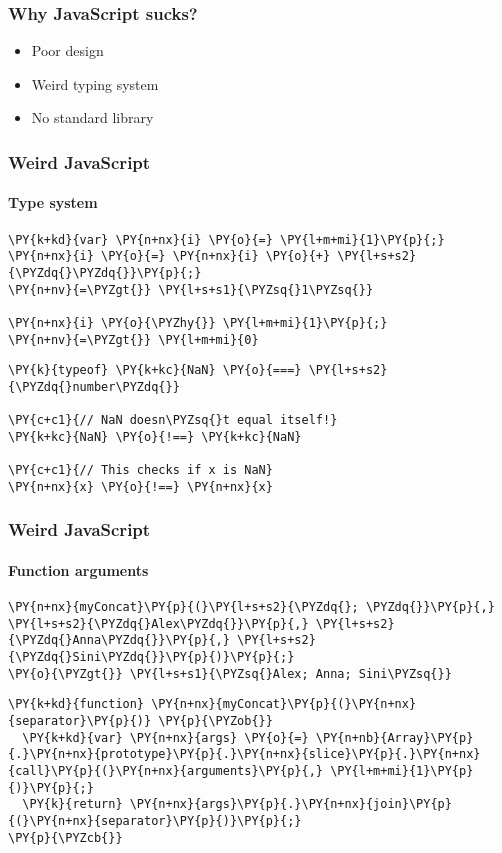 \begin{frame}
  \frametitle{Why JavaScript sucks?}
  \begin{itemize}
  \item Poor design
  \item Weird typing system
  \item No standard library
  \end{itemize}
\end{frame}


\begin{frame}[fragile]
  \frametitle{Weird JavaScript}
  \framesubtitle{Type system}
\begin{Verbatim}[commandchars=\\\{\}]
\PY{k+kd}{var} \PY{n+nx}{i} \PY{o}{=} \PY{l+m+mi}{1}\PY{p}{;}
\PY{n+nx}{i} \PY{o}{=} \PY{n+nx}{i} \PY{o}{+} \PY{l+s+s2}{\PYZdq{}\PYZdq{}}\PY{p}{;}
\PY{n+nv}{=\PYZgt{}} \PY{l+s+s1}{\PYZsq{}1\PYZsq{}}

\PY{n+nx}{i} \PY{o}{\PYZhy{}} \PY{l+m+mi}{1}\PY{p}{;}
\PY{n+nv}{=\PYZgt{}} \PY{l+m+mi}{0}
\end{Verbatim}

  \pause

\begin{Verbatim}[commandchars=\\\{\}]
\PY{k}{typeof} \PY{k+kc}{NaN} \PY{o}{===} \PY{l+s+s2}{\PYZdq{}number\PYZdq{}}

\PY{c+c1}{// NaN doesn\PYZsq{}t equal itself!}
\PY{k+kc}{NaN} \PY{o}{!==} \PY{k+kc}{NaN}

\PY{c+c1}{// This checks if x is NaN}
\PY{n+nx}{x} \PY{o}{!==} \PY{n+nx}{x}
\end{Verbatim}
\end{frame}


\begin{frame}[fragile]
  \frametitle{Weird JavaScript}
  \framesubtitle{Function arguments}
\begin{Verbatim}[commandchars=\\\{\}]
\PY{n+nx}{myConcat}\PY{p}{(}\PY{l+s+s2}{\PYZdq{}; \PYZdq{}}\PY{p}{,} \PY{l+s+s2}{\PYZdq{}Alex\PYZdq{}}\PY{p}{,} \PY{l+s+s2}{\PYZdq{}Anna\PYZdq{}}\PY{p}{,} \PY{l+s+s2}{\PYZdq{}Sini\PYZdq{}}\PY{p}{)}\PY{p}{;}
\PY{o}{\PYZgt{}} \PY{l+s+s1}{\PYZsq{}Alex; Anna; Sini\PYZsq{}}

\end{Verbatim}

\pause

\begin{Verbatim}[commandchars=\\\{\}]
\PY{k+kd}{function} \PY{n+nx}{myConcat}\PY{p}{(}\PY{n+nx}{separator}\PY{p}{)} \PY{p}{\PYZob{}}
  \PY{k+kd}{var} \PY{n+nx}{args} \PY{o}{=} \PY{n+nb}{Array}\PY{p}{.}\PY{n+nx}{prototype}\PY{p}{.}\PY{n+nx}{slice}\PY{p}{.}\PY{n+nx}{call}\PY{p}{(}\PY{n+nx}{arguments}\PY{p}{,} \PY{l+m+mi}{1}\PY{p}{)}\PY{p}{;}
  \PY{k}{return} \PY{n+nx}{args}\PY{p}{.}\PY{n+nx}{join}\PY{p}{(}\PY{n+nx}{separator}\PY{p}{)}\PY{p}{;}
\PY{p}{\PYZcb{}}
\end{Verbatim}

\end{frame}


